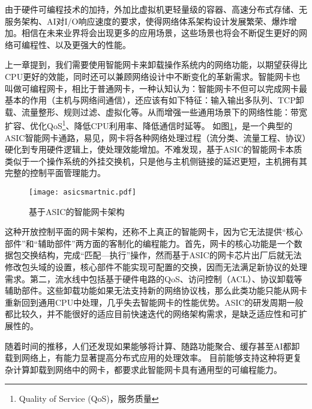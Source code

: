 由于硬件可编程技术的加持，外加比虚拟机更轻量级的容器、高速分布式存储、无服务架构、AI对I/O响应速度的要求，使得网络体系架构设计发展繁荣、爆炸增加。相信在未来业界将会出现更多的应用场景，这些场景也将会不断促生更好的网络可编程性、以及更强大的性能。








上一章提到，我们需要使用智能网卡来卸载操作系统内的网络功能，以期望获得比CPU更好的效能，同时还可以兼顾网络设计中不断变化的革新需求。智能网卡也叫做可编程网卡，相比于普通网卡，一种认知认为：智能网卡不但可以完成网卡最基本的作用（主机与网络间通信），还应该有如下特征：输入输出多队列、TCP卸载、流量整形、规则过滤、虚拟化等。从而增强一些通用场景下的网络性能：带宽扩容、优化QoS\footnote{Quality of Service (QoS)，服务质量}、降低CPU利用率、降低通信时延等。
如图\ref{asicsmartnic}，是一个典型的ASIC智能网卡通路，易见，网卡将各种网络处理过程（流分类、流量工程、协议）硬化到专用硬件逻辑上，使处理效能增加。不难发现，基于ASIC的智能网卡本质类似于一个操作系统的外挂交换机，只是他与主机侧链接的延迟更短，主机拥有其完整的控制平面管理能力。

\begin{figure}[!ht]
	\centering
	\texttt{[image: asicsmartnic.pdf]}
	\caption{基于ASIC的智能网卡架构} \label{asicsmartnic}
\end{figure}

这种开放控制平面的网卡架构，还称不上真正的智能网卡，因为它无法提供“核心部件”和“辅助部件”两方面的客制化的编程能力。首先，网卡的核心功能是一个数据包交换结构，完成“匹配---执行”操作，然而基于ASIC的网卡芯片出厂后就无法修改包头域的设置，核心部件不能实现可配置的交换，因而无法满足新协议的处理需求。第二，流水线中包括基于硬件电路的QoS、访问控制（ACL）、协议卸载等辅助部件。这些卸载功能如果无法支持新的网络协议栈，那么此类功能只能从网卡重新回到通用CPU中处理，几乎失去智能网卡的性能优势。ASIC的研发周期一般都比较久，并不能很好的适应目前快速迭代的网络架构需求，是缺乏适应性和可扩展性的。

随着时间的推移，人们还发现如果能够将计算、随路功能聚合、缓存甚至AI都卸载到网络上，有能力显著提高分布式应用的处理效率。%
目前能够支持这种将更复杂计算卸载到网络中的网卡，都要求此智能网卡具有通用型的可编程能力。


